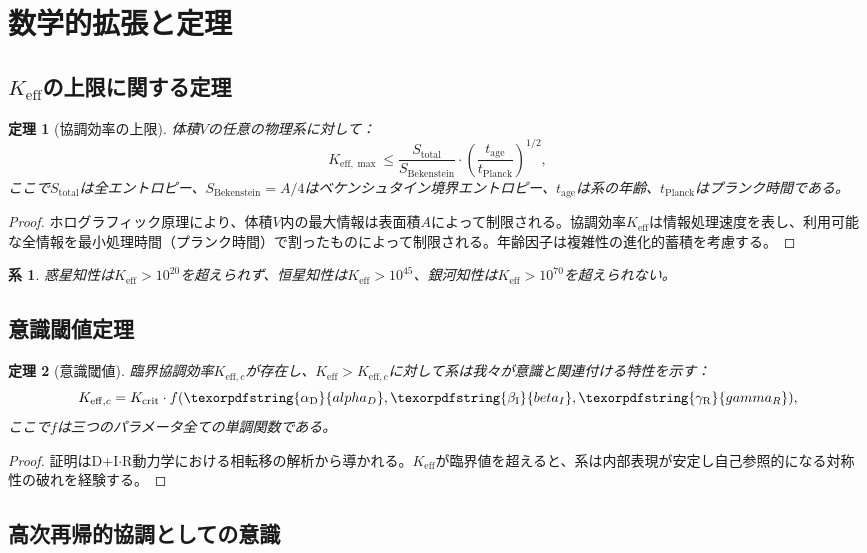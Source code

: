 \documentclass[11pt,a4paper]{article}
\newtheorem{theorem}{定理}
\newtheorem{corollary}{系}
\DeclareRobustCommand{\alD}{\texorpdfstring{\ensuremath{\alpha_{\mathrm{D}}}}{alpha_D}}
\DeclareRobustCommand{\beI}{\texorpdfstring{\ensuremath{\beta_{\mathrm{I}}}}{beta_I}}
\DeclareRobustCommand{\gaR}{\texorpdfstring{\ensuremath{\gamma_{\mathrm{R}}}}{gamma_R}}
\newcommand{\eff}{\mathrm{eff}}
\newcommand{\Ke}{K_{\eff}}
\newcommand{\Kemax}{K_{\eff,\max}}
\newcommand{\Kec}{K_{\eff,c}}
\newcommand{\Kcrit}{K_{\mathrm{crit}}}
\begin{document}
	\section{数学的拡張と定理}
	
	\subsection{\(\Ke\)の上限に関する定理}
	
	\begin{theorem}[協調効率の上限]
		体積\(V\)の任意の物理系に対して：
		\[
		\Kemax \leq \frac{S_{\mathrm{total}}}{S_{\mathrm{Bekenstein}}} \cdot \left(\frac{t_{\mathrm{age}}}{t_{\mathrm{Planck}}}\right)^{1/2},
		\]
		ここで\(S_{\mathrm{total}}\)は全エントロピー、\(S_{\mathrm{Bekenstein}} = A/4\)はベケンシュタイン境界エントロピー、\(t_{\mathrm{age}}\)は系の年齢、\(t_{\mathrm{Planck}}\)はプランク時間である。
	\end{theorem}
	
	\begin{proof}
		ホログラフィック原理により、体積\(V\)内の最大情報は表面積\(A\)によって制限される。協調効率\(\Ke\)は情報処理速度を表し、利用可能な全情報を最小処理時間（プランク時間）で割ったものによって制限される。年齢因子は複雑性の進化的蓄積を考慮する。
	\end{proof}
	
	\begin{corollary}
		惑星知性は\(\Ke > 10^{20}\)を超えられず、恒星知性は\(\Ke > 10^{45}\)、銀河知性は\(\Ke > 10^{70}\)を超えられない。
	\end{corollary}
	
	\subsection{意識閾値定理}
	
	\begin{theorem}[意識閾値]
		臨界協調効率\(K_{\eff,c}\)が存在し、\(\Ke > K_{\eff,c}\)に対して系は我々が意識と関連付ける特性を示す：
		\[
		\Kec = \Kcrit \cdot f(\alD, \beI, \gaR),
		\]
		ここで\(f\)は三つのパラメータ全ての単調関数である。
	\end{theorem}
	
	\begin{proof}
		証明はD+I\(\cdot\)R動力学における相転移の解析から導かれる。\(\Ke\)が臨界値を超えると、系は内部表現が安定し自己参照的になる対称性の破れを経験する。
	\end{proof}
	
	\subsection{高次再帰的協調としての意識}
	\label{subsec:recursive-coordination}
	
\end{document}
